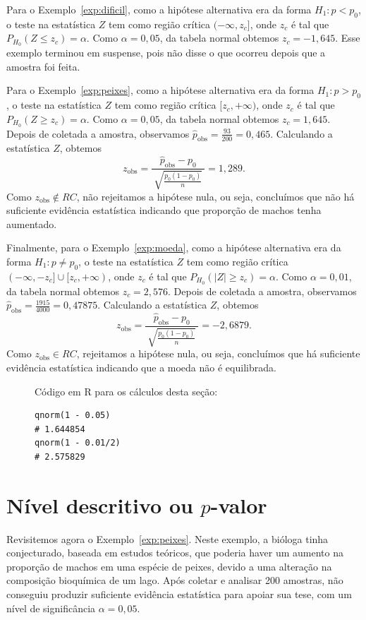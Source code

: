 \documentclass[12pt,a4paper]{article}
\theoremstyle{plain}
\theoremstyle{definition}
\theoremstyle{remark}
\begin{document}
Para o Exemplo~\ref{exp:dificil}, como a hipótese alternativa era da forma $H_1:p<p_0$, o teste na estatística $Z$ tem como região crítica $(-\infty, z_c]$, onde $z_c$ é tal que $P_{H_0}(Z \leq z_c) = \alpha$.
Como $\alpha=0,05$, da tabela normal obtemos $z_c = -1,645$.
Esse exemplo terminou em suspense, pois não disse o que ocorreu depois que a amostra foi feita.

Para o Exemplo~\ref{exp:peixes}, como a hipótese alternativa era da forma $H_1:p>p_0$, o teste na estatística $Z$ tem como região crítica $[z_c, +\infty)$, onde $z_c$ é tal que $P_{H_0}(Z \geq z_c) = \alpha$.
Como $\alpha=0,05$, da tabela normal obtemos $z_c = 1,645$.
Depois de coletada a amostra, observamos $\hat{p}_{\mathrm{obs}} = \frac{93}{200} = 0,465$.
Calculando a estatística $Z$, obtemos
\[
z_{\mathrm{obs}} = \frac{\hat{p}_{\mathrm{obs}}-p_0}{\ \sqrt{\frac{p_0(1-p_0)}{n}}\ }
=
1,289
.
\]
Como $z_{\mathrm{obs}} \not\in RC$, não rejeitamos a hipótese nula, ou seja, concluímos que não há suficiente evidência estatística indicando que proporção de machos tenha aumentado.

Finalmente, para o Exemplo~\ref{exp:moeda}, como a hipótese alternativa era da forma $H_1:p \ne p_0$, o teste na estatística $Z$ tem como região crítica $(-\infty, -z_{c}] \cup [z_c, +\infty)$, onde $z_c$ é tal que $P_{H_0}(|Z| \geq z_c) = \alpha$.
Como $\alpha=0,01$, da tabela normal obtemos $z_c = 2,576$.
Depois de coletada a amostra, observamos $\hat{p}_{\mathrm{obs}} = \frac{1915}{4000} = 0,47875$.
Calculando a estatística $Z$, obtemos
\[
z_{\mathrm{obs}} = \frac{\hat{p}_{\mathrm{obs}}-p_0}{\ \sqrt{\frac{p_0(1-p_0)}{n}}\ }
=
-2,6879
.
\]
Como $z_{\mathrm{obs}} \in RC$, rejeitamos a hipótese nula, ou seja, concluímos que há suficiente evidência estatística indicando que a moeda não é equilibrada.

\begin{figure}[H]
Código em R para os cálculos desta seção:
\footnotesize
\begin{verbatim}
qnorm(1 - 0.05)
# 1.644854
qnorm(1 - 0.01/2)
# 2.575829
\end{verbatim}
\end{figure}


\section{Nível descritivo ou $p$-valor}

Revisitemos agora o Exemplo~\ref{exp:peixes}. Neste exemplo, a bióloga tinha conjecturado, baseada em estudos teóricos, que poderia haver um aumento na proporção de machos em uma espécie de peixes, devido a uma alteração na composição bioquímica de um lago. Após coletar e analisar 200 amostras, não conseguiu produzir suficiente evidência estatística para apoiar sua tese, com um nível de significância $\alpha=0,05$.
\end{document}
